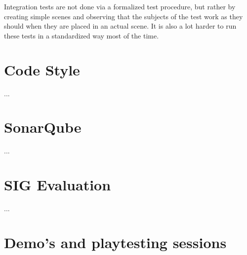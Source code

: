 	Integration tests are not done via a formalized test procedure, but rather by
	creating simple scenes and observing that the subjects of the test work
	as they should when they are placed in an actual scene. It is also a lot
	harder to run these tests in a standardized way most of the time. 
		
	\section{Code Style} \label{sec:codestyle}
		...
		
	\section{SonarQube} \label{sec:sonarqube}
		...
		
	\section{SIG Evaluation} \label{sec:sigevaluation}
		...
		
	\section{Demo's and playtesting sessions} \label{sec:demos}
